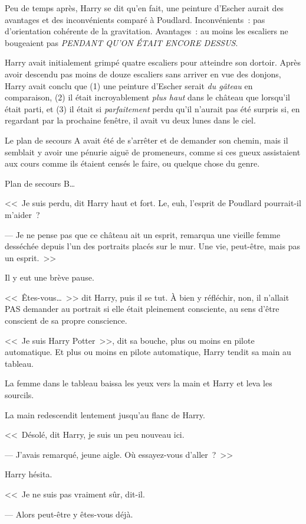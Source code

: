 Peu de temps après, Harry se dit qu'en fait, une peinture d'Escher aurait des avantages et des inconvénients comparé à Poudlard. Inconvénients~: pas d'orientation cohérente de la gravitation. Avantages~: au moins les escaliers ne bougeaient pas \emph{PENDANT QU'ON ÉTAIT ENCORE DESSUS}.

Harry avait initialement grimpé quatre escaliers pour atteindre son dortoir. Après avoir descendu pas moins de douze escaliers sans arriver en vue des donjons, Harry avait conclu que (1) une peinture d'Escher serait \emph{du gâteau} en comparaison, (2) il était incroyablement \emph{plus haut} dans le château que lorsqu'il était parti, et (3) il était si \emph{parfaitement} perdu qu'il n'aurait pas été surpris si, en regardant par la prochaine fenêtre, il avait vu deux lunes dans le ciel.

Le plan de secours A avait été de s'arrêter et de demander son chemin, mais il semblait y avoir une pénurie aiguë de promeneurs, comme si ces gueux assistaient aux cours comme ils étaient censés le faire, ou quelque chose du genre.

Plan de secours B…

<<~Je suis perdu, dit Harry haut et fort. Le, euh, l'esprit de Poudlard pourrait-il m'aider~?

--- Je ne pense pas que ce château ait un esprit, remarqua une vieille femme desséchée depuis l'un des portraits placés sur le mur. Une vie, peut-être, mais pas un esprit.~>>

Il y eut une brève pause.

<<~Êtes-vous…~>> dit Harry, puis il se tut. À bien y réfléchir, non, il n'allait PAS demander au portrait si elle était pleinement consciente, au sens d'être conscient de sa propre conscience.

<<~Je suis Harry Potter~>>, dit sa bouche, plus ou moins en pilote automatique. Et plus ou moins en pilote automatique, Harry tendit sa main au tableau.

La femme dans le tableau baissa les yeux vers la main et Harry et leva les sourcils.

La main redescendit lentement jusqu'au flanc de Harry.

<<~Désolé, dit Harry, je suis un peu nouveau ici.

--- J'avais remarqué, jeune aigle. Où essayez-vous d'aller~?~>>

Harry hésita.

<<~Je ne suis pas vraiment sûr, dit-il.

--- Alors peut-être y êtes-vous déjà.

